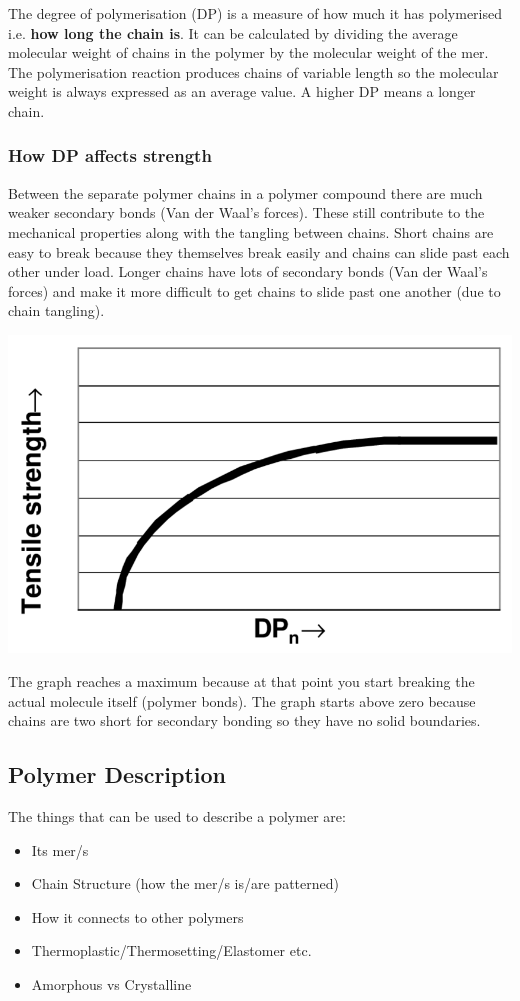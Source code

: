 \documentclass[12pt]{article}
\begin{document}
The degree of polymerisation (DP) is a measure of how much it has polymerised i.e. \textbf{how long the chain is}.
It can be calculated by dividing the average molecular weight of chains in the polymer by the molecular weight of the mer.
The polymerisation reaction produces chains of variable length so the molecular weight is always expressed as an average value.
A higher DP means a longer chain.

\subsubsection{How DP affects strength}
Between the separate polymer chains in a polymer compound there are much weaker secondary bonds (Van der Waal's forces). 
These still contribute to the mechanical properties along with the tangling between chains.
Short chains are easy to break because they themselves break easily and chains can slide past each other under load.
Longer chains have lots of secondary bonds (Van der Waal's forces) and make it more difficult to get chains to slide past one another (due to chain tangling).

\includegraphics[scale=0.3]{strengthagainstdp}

The graph reaches a maximum because at that point you start breaking the actual molecule itself (polymer bonds).
The graph starts above zero because chains are two short for secondary bonding so they have no solid boundaries.

\subsection{Polymer Description}
The things that can be used to describe a polymer are: 
\begin{itemize}
  \item Its mer/s
  \item Chain Structure (how the mer/s is/are patterned) 
  \item How it connects to other polymers
  \item Thermoplastic/Thermosetting/Elastomer etc.
  \item Amorphous vs Crystalline 
\end{itemize}
\end{document}

